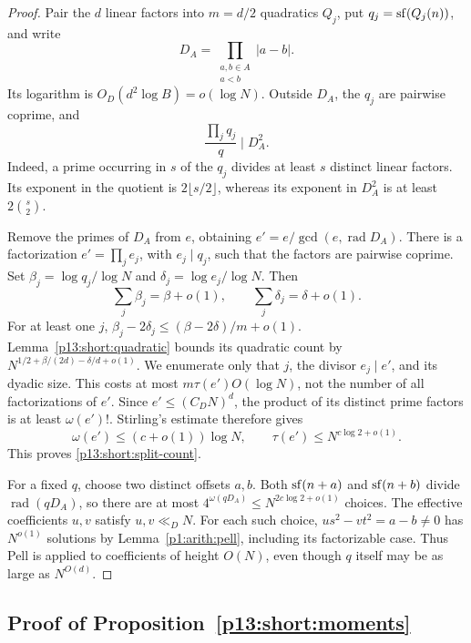 \begin{proof}
Pair the \(d\) linear factors into \(m=d/2\) quadratics
\(Q_j\), put \(q_j=\sf(Q_j(n))\), and write
\[
 D_A=\prod_{\substack{a,b\in A\\a<b}}|a-b|.
\]
Its logarithm is \(O_D(d^2\log B)=o(\log N)\).
Outside \(D_A\), the \(q_j\) are pairwise coprime, and
\begin{equation}
 \frac{\prod_jq_j}{q}\mid D_A^2.
 \label{p13:short:resultant}
\end{equation}
Indeed, a prime occurring in \(s\) of the \(q_j\) divides at
least \(s\) distinct linear factors. Its exponent in the
quotient is \(2\lfloor s/2\rfloor\), whereas its exponent
in \(D_A^2\) is at least \(2\binom{s}{2}\).

Remove the primes of \(D_A\) from \(e\), obtaining
\(e'=e/\gcd(e,\operatorname{rad}D_A)\).
There is a factorization \(e'=\prod_j e_j\), with
\(e_j\mid q_j\), such that the factors are pairwise coprime.
Set \(\beta_j=\log q_j/\log N\) and
\(\delta_j=\log e_j/\log N\). Then
\[
 \sum_j\beta_j=\beta+o(1),\qquad
 \sum_j\delta_j=\delta+o(1).
\]
For at least one \(j\),
\(\beta_j-2\delta_j\le(\beta-2\delta)/m+o(1)\).
Lemma~\ref{p13:short:quadratic} bounds its quadratic count
by \(N^{1/2+\beta/(2d)-\delta/d+o(1)}\).
We enumerate only that \(j\), the divisor \(e_j\mid e'\),
and its dyadic size. This costs at most
\(m\tau(e')O(\log N)\), not the number of all factorizations
of \(e'\). Since \(e'\le(C_DN)^d\), the product of its distinct
prime factors is at least \(\omega(e')!\). Stirling's estimate
therefore gives
\[
 \omega(e')\le(c+o(1))\log N,\qquad
 \tau(e')\le N^{c\log2+o(1)}.
\]
This proves \eqref{p13:short:split-count}.

For a fixed \(q\), choose two distinct offsets \(a,b\).
Both \(\sf(n+a)\) and \(\sf(n+b)\) divide
\(\operatorname{rad}(qD_A)\), so there are at most
\(4^{\omega(qD_A)}\le N^{2c\log2+o(1)}\) choices.
The effective coefficients \(u,v\) satisfy \(u,v\ll_D N\).
For each such choice,
\(us^2-vt^2=a-b\ne0\) has \(N^{o(1)}\) solutions by
Lemma~\ref{p1:arith:pell}, including its factorizable case.
Thus Pell is applied to coefficients of height \(O(N)\),
even though \(q\) itself may be as large as \(N^{O(d)}\).
\end{proof}

\subsection{Proof of Proposition~\ref{p13:short:moments}}
\label{p14:comp:short:moments}

